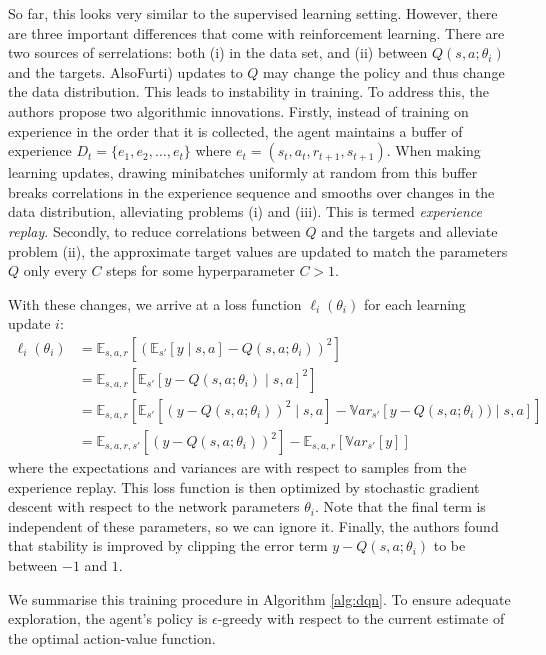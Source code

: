 \documentclass[11pt, a4paper, bibliography=totoc]{report}
\newcommand{\E}[2]{\mathbb{E}_{#1} \left[ #2 \right] }
\newcommand{\V}[2]{\mathbb{V}ar_{#1} \left[ #2 \right]}
\begin{document}
So far, this looks very similar to the supervised learning setting. However, there are three important differences that come with reinforcement learning. There are two sources of serrelations: both (i) in the data set, and (ii) between $ Q(s,a ; \theta_i) $ and the targets. AlsoFurti) updates to $ Q $ may change the policy and thus change the data distribution. This leads to instability in training. To address this, the authors propose two algorithmic innovations. Firstly, instead of training on experience in the order that it is collected, the agent maintains a buffer of experience $ D_t = \{ e_1, e_2, \dots, e_t \} $ where $ e_t = (s_t, a_t, r_{t+1}, s_{t+1}) $. When making learning updates, drawing minibatches uniformly at random from this buffer breaks correlations in the experience sequence and smooths over changes in the data distribution, alleviating problems (i) and (iii). This is termed \textit{experience replay}. Secondly, to reduce correlations between $ Q $ and the targets and alleviate problem (ii), the approximate target values are updated to match the parameters $ Q $ only every $ C $ steps for some hyperparameter $ C > 1 $.

With these changes, we arrive at a loss function $ \ell_i(\theta_i) $ for each learning update $ i $:
\begin{align*}
\ell_i(\theta_i) &= \E{ s,a,r }{ (\E{s'}{y \mid s,a} - Q(s,a;\theta_i))^2 } \\
                 &= \E{ s,a,r }{ \E{s'}{y - Q(s,a;\theta_i) \mid s,a } ^2 } \\
                 &= \E{ s,a,r }{ \E{s'}{(y - Q(s,a;\theta_i))^2 \mid s,a}  - \V{s'}{y - Q(s,a;\theta_i)) \mid s,a}   } \\
                 &= \E{s,a,r,s'}{(y - Q(s,a;\theta_i))^2} - \E{s,a,r}{\V{s'}{y}}
\end{align*}
where the expectations and variances are with respect to samples from the experience replay. This loss function is then optimized by stochastic gradient descent with respect to the network parameters $ \theta_i $. Note that the final term is independent of these parameters, so we can ignore it. Finally, the authors found that stability is improved by clipping the error term $ y - Q(s,a;\theta_i) $ to be between $ -1 $ and $ 1 $.

We summarise this training procedure in Algorithm \ref{alg:dqn}. To ensure adequate exploration, the agent's policy is $ \epsilon $-greedy with respect to the current estimate of the optimal action-value function.
\end{document}
